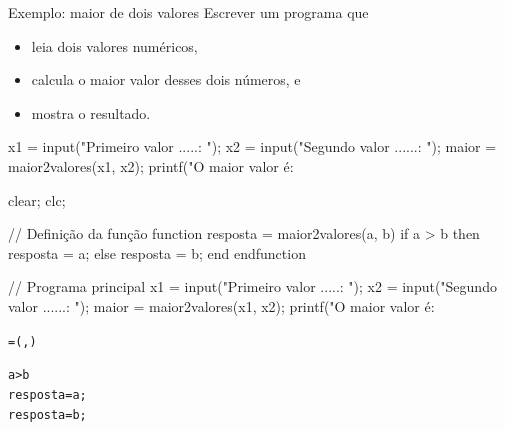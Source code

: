 \begin{frame}{Exemplo: maior de dois valores}
  Escrever um programa que
  \begin{itemize}
    \item leia dois valores numéricos,
    \item calcula o maior valor desses dois números, e
    \item mostra o resultado.
  \end{itemize}

  \begin{pygmented}[lang=scilab]
x1 = input("Primeiro valor .....: ");
x2 = input("Segundo valor ......: ");
maior = maior2valores(x1, x2);
printf("O maior valor é: %
  \end{pygmented}

  \begin{pygmented}[lang=scilab]
clear; clc;

// Definição da função
function resposta = maior2valores(a, b)
    if a > b then
        resposta = a;
    else
        resposta = b;
    end
endfunction

// Programa principal
x1 = input("Primeiro valor .....: ");
x2 = input("Segundo valor ......: ");
maior = maior2valores(x1, x2);
printf("O maior valor é: %
  \end{pygmented}

  \framebreak
  \mbox{}\vspace{1cm}
  \begin{mdframed}
    \begin{alltt}

  = (, )

     a > b 
        resposta = a;
        resposta = b;

    \end{alltt}    
  \end{mdframed}


\end{frame}
